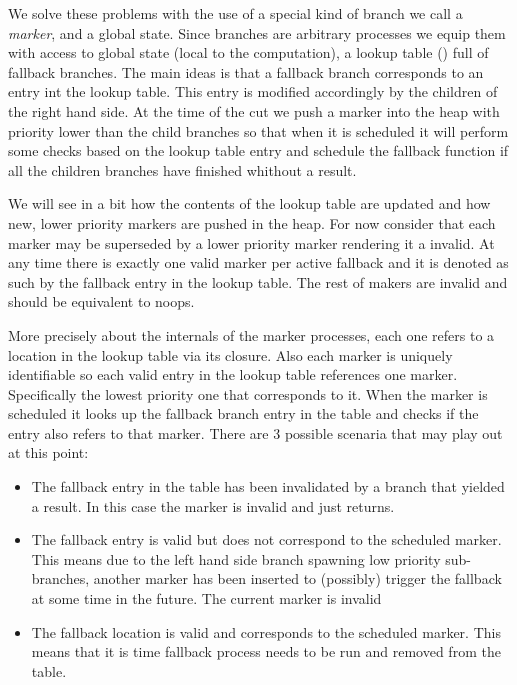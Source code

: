 We solve these problems with the use of a special kind of branch we
call a \emph{marker}, and a global state. Since branches are arbitrary
processes we equip them with access to global state (local to the
computation), a lookup table () full of fallback
branches. The main ideas is that a fallback branch corresponds to an
entry int the lookup table. This entry is modified accordingly by the
children of the right hand side. At the time of the cut we push a
marker into the heap with priority lower than the child branches so
that when it is scheduled it will perform some checks based on the
lookup table entry and schedule the fallback function if all the
children branches have finished whithout a result.

We will see in a bit how the contents of the lookup table are updated
and how new, lower priority markers are pushed in the heap. For now
consider that each marker may be superseded by a lower priority marker
rendering it a invalid. At any time there is exactly one valid marker
per active fallback and it is denoted as such by the fallback entry in
the lookup table. The rest of makers are invalid and should be
equivalent to noops.

More precisely about the internals of the marker processes, each one
refers to a location in the lookup table via its closure. Also each
marker is uniquely identifiable so each valid entry in the lookup
table references one marker. Specifically the lowest priority one that
corresponds to it. When the marker is scheduled it looks up the
fallback branch entry in the table and checks if the entry also refers
to that marker. There are 3 possible scenaria that may play out at
this point:

\begin{itemize}
\item The fallback entry in the table has been invalidated by a branch
that yielded a result. In this case the marker is invalid and just
returns.
\item The fallback entry is valid but does not correspond to the scheduled
marker. This means due to the left hand side branch spawning low
priority sub-branches, another marker has been inserted to
(possibly) trigger the fallback at some time in the future. The
current marker is invalid
\item The fallback location is valid and corresponds to the scheduled
marker. This means that it is time fallback process needs to be run
and removed from the table.
\end{itemize}

